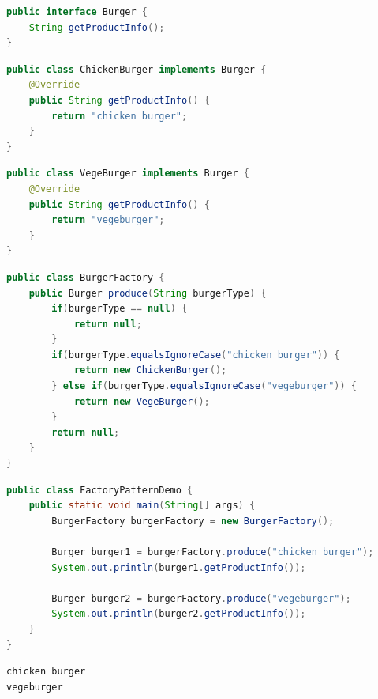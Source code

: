 \vspace{0.5cm}

\begin{lstlisting}[language=Java, title=Burger.java]
public interface Burger {
    String getProductInfo();
}
\end{lstlisting}

\begin{lstlisting}[language=Java, title=ChickenBurger.java]
public class ChickenBurger implements Burger {
    @Override
    public String getProductInfo() {
        return "chicken burger";
    }
}
\end{lstlisting}

\begin{lstlisting}[language=Java, title=VegeBurger.java]
public class VegeBurger implements Burger {
    @Override
    public String getProductInfo() {
        return "vegeburger";
    }
}
\end{lstlisting}

\begin{lstlisting}[language=Java, title=BurgerFactory.java]
public class BurgerFactory {
    public Burger produce(String burgerType) {
        if(burgerType == null) {
            return null;
        }
        if(burgerType.equalsIgnoreCase("chicken burger")) {
            return new ChickenBurger();
        } else if(burgerType.equalsIgnoreCase("vegeburger")) {
            return new VegeBurger();
        }
        return null;
    }
}
\end{lstlisting}

\begin{lstlisting}[language=Java, title=FactoryPatternDemo.java]
public class FactoryPatternDemo {
    public static void main(String[] args) {
        BurgerFactory burgerFactory = new BurgerFactory();

        Burger burger1 = burgerFactory.produce("chicken burger");
        System.out.println(burger1.getProductInfo());

        Burger burger2 = burgerFactory.produce("vegeburger");
        System.out.println(burger2.getProductInfo());
    }
}
\end{lstlisting}

\begin{tcolorbox}
    \begin{verbatim}
chicken burger
vegeburger
\end{verbatim}
\end{tcolorbox}

\newpage


